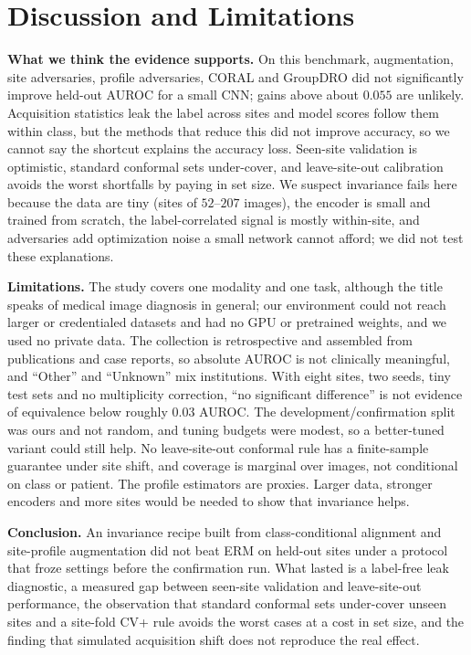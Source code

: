 \documentclass[10pt]{article}
\newcommand{\erm}{ERM}
\begin{document}
\section{Discussion and Limitations}
\textbf{What we think the evidence supports.} On this benchmark, augmentation, site adversaries, profile adversaries, CORAL and GroupDRO did not significantly improve held-out AUROC for a small CNN; gains above about $0.055$ are unlikely. Acquisition statistics leak the label across sites and model scores follow them within class, but the methods that reduce this did not improve accuracy, so we cannot say the shortcut explains the accuracy loss. Seen-site validation is optimistic, standard conformal sets under-cover, and leave-site-out calibration avoids the worst shortfalls by paying in set size. We suspect invariance fails here because the data are tiny (sites of $52$--$207$ images), the encoder is small and trained from scratch, the label-correlated signal is mostly within-site, and adversaries add optimization noise a small network cannot afford; we did not test these explanations.

\textbf{Limitations.} The study covers one modality and one task, although the title speaks of medical image diagnosis in general; our environment could not reach larger or credentialed datasets and had no GPU or pretrained weights, and we used no private data. The collection is retrospective and assembled from publications and case reports, so absolute AUROC is not clinically meaningful, and ``Other'' and ``Unknown'' mix institutions. With eight sites, two seeds, tiny test sets and no multiplicity correction, ``no significant difference'' is not evidence of equivalence below roughly $0.03$ AUROC. The development/confirmation split was ours and not random, and tuning budgets were modest, so a better-tuned variant could still help. No leave-site-out conformal rule has a finite-sample guarantee under site shift, and coverage is marginal over images, not conditional on class or patient. The profile estimators are proxies. Larger data, stronger encoders and more sites would be needed to show that invariance helps.

\textbf{Conclusion.} An invariance recipe built from class-conditional alignment and site-profile augmentation did not beat \erm{} on held-out sites under a protocol that froze settings before the confirmation run. What lasted is a label-free leak diagnostic, a measured gap between seen-site validation and leave-site-out performance, the observation that standard conformal sets under-cover unseen sites and a site-fold CV+ rule avoids the worst cases at a cost in set size, and the finding that simulated acquisition shift does not reproduce the real effect.
\end{document}
